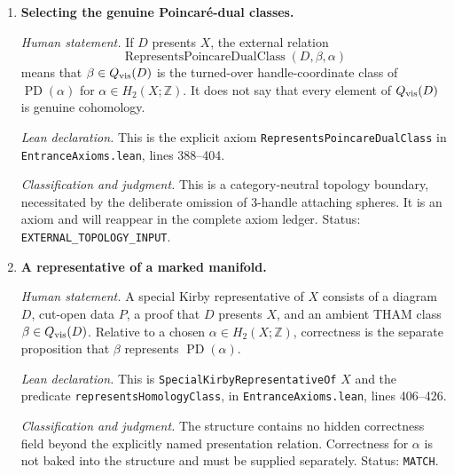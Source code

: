 \begin{enumerate}[label=\textbf{H\arabic*.},leftmargin=*]
\emph{Lean declaration.}
\begin{verbatim}
structure HomologicallyMarkedDiagram where
  diagram : SpecialKirbyDiagram
  cut : DottedCutPresentation diagram
  thamAlpha : ThamMarkingClass diagram
\end{verbatim}
This is \nolinkurl{Homology.lean}, lines 216--220.

\emph{Classification and judgment.}
This is data only.  It does not claim that $\beta$ is the Poincaré dual of a
manifold homology class.  Status: \nolinkurl{MATCH_AS_DIAGRAM_LEVEL_DATA}.

\item \textbf{Selecting the genuine Poincaré-dual classes.}

\emph{Human statement.}
If $D$ presents $X$, the external relation
\[
 \operatorname{RepresentsPoincareDualClass}(D,\beta,\alpha)
\]
means that $\beta\in Q_{\rm vis}(D)$ is the turned-over handle-coordinate
class of $\operatorname{PD}(\alpha)$ for
$\alpha\in H_2(X;\mathbb Z)$.  It does not say that every element of
$Q_{\rm vis}(D)$ is genuine cohomology.

\emph{Lean declaration.}
This is the explicit axiom \texttt{RepresentsPoincareDualClass} in
\nolinkurl{EntranceAxioms.lean}, lines 388--404.

\emph{Classification and judgment.}
This is a category-neutral topology boundary, necessitated by the deliberate
omission of $3$-handle attaching spheres.  It is an axiom and will reappear in
the complete axiom ledger.  Status: \nolinkurl{EXTERNAL_TOPOLOGY_INPUT}.

\item \textbf{A representative of a marked manifold.}

\emph{Human statement.}
A special Kirby representative of $X$ consists of a diagram $D$, cut-open
data $P$, a proof that $D$ presents $X$, and an ambient THAM class
$\beta\in Q_{\rm vis}(D)$.  Relative to a chosen
$\alpha\in H_2(X;\mathbb Z)$, correctness is the separate proposition that
$\beta$ represents $\operatorname{PD}(\alpha)$.

\emph{Lean declaration.}
This is \nolinkurl{SpecialKirbyRepresentativeOf} $X$ and the predicate
\nolinkurl{representsHomologyClass}, in \nolinkurl{EntranceAxioms.lean}, lines
406--426.

\emph{Classification and judgment.}
The structure contains no hidden correctness field beyond the explicitly
named presentation relation.  Correctness for $\alpha$ is not baked into the
structure and must be supplied separately.  Status: \texttt{MATCH}.


\end{enumerate}
